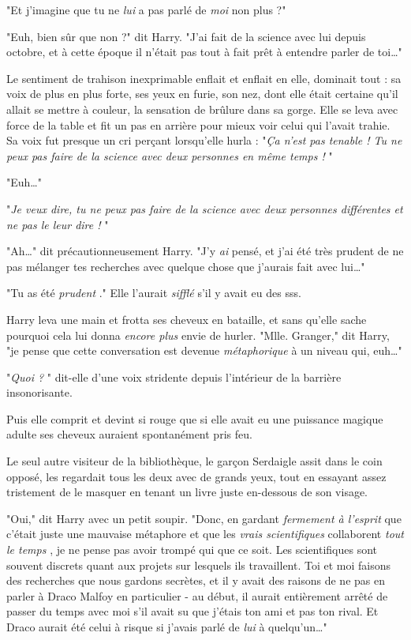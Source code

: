 "Et j'imagine que tu ne \emph{lui}  a pas parlé de \emph{moi}  non plus ?"

"Euh, bien sûr que non ?" dit Harry. "J'ai fait de la science avec lui depuis octobre, et à cette époque il n'était pas tout à fait prêt à entendre parler de toi…"

Le sentiment de trahison inexprimable enflait et enflait en elle, dominait tout : sa voix de plus en plus forte, ses yeux en furie, son nez, dont elle était certaine qu'il allait se mettre à couleur, la sensation de brûlure dans sa gorge. Elle se leva avec force de la table et fit un pas en arrière pour mieux voir celui qui l'avait trahie. Sa voix fut presque un cri perçant lorsqu'elle hurla : "\emph{Ça n'est pas tenable ! Tu ne peux pas faire de la science avec deux personnes en même temps !} "

"Euh…"

"\emph{Je veux dire, tu ne peux pas faire de la science avec deux personnes différentes et ne pas le leur dire !} "

"Ah…" dit précautionneusement Harry. "J'y \emph{ai}  pensé, et j'ai été très prudent de ne pas mélanger tes recherches avec quelque chose que j'aurais fait avec lui…"

"Tu as été \emph{prudent} ." Elle l'aurait \emph{sifflé}  s'il y avait eu des sss.

Harry leva une main et frotta ses cheveux en bataille, et sans qu'elle sache pourquoi cela lui donna \emph{encore plus}  envie de hurler. "Mlle. Granger," dit Harry, "je pense que cette conversation est devenue \emph{métaphorique}  à un niveau qui, euh…"

"\emph{Quoi ?} " dit-elle d'une voix stridente depuis l'intérieur de la barrière insonorisante.

Puis elle comprit et devint si rouge que si elle avait eu une puissance magique adulte ses cheveux auraient spontanément pris feu.

Le seul autre visiteur de la bibliothèque, le garçon Serdaigle assit dans le coin opposé, les regardait tous les deux avec de grands yeux, tout en essayant assez tristement de le masquer en tenant un livre juste en-dessous de son visage.

"Oui," dit Harry avec un petit soupir. "Donc, en gardant \emph{fermement à l'esprit}  que c'était juste une mauvaise métaphore et que les \emph{vrais scientifiques}  collaborent \emph{tout le temps} , je ne pense pas avoir trompé qui que ce soit. Les scientifiques sont souvent discrets quant aux projets sur lesquels ils travaillent. Toi et moi faisons des recherches que nous gardons secrètes, et il y avait des raisons de ne pas en parler à Draco Malfoy en particulier - au début, il aurait entièrement arrêté de passer du temps avec moi s'il avait su que j'étais ton ami et pas ton rival. Et Draco aurait été celui à risque si j'avais parlé de \emph{lui}  à quelqu'un…"

